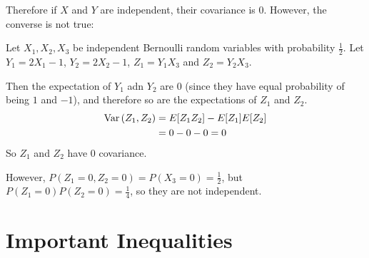 \documentclass[../Main.tex]{subfiles}
\begin{document}
Therefore if $X$ and $Y$ are independent, their covariance is 0. However, the converse is not true:
\begin{example}
    Let $X_1, X_2, X_3$ be independent Bernoulli random variables with probability $\frac{1}{2}$. Let $Y_1 = 2X_1 - 1$, $Y_2 = 2X_2 - 1$, $Z_1 = Y_1 X_3$ and $Z_2 = Y_2 X_3$.\par
    Then the expectation of $Y_1$ adn $Y_2$ are 0 (since they have equal probability of being $1$ and $-1$), and therefore so are the expectations of $Z_1$ and $Z_2$.
    \begin{align*}
        \operatorname{Var}{(Z_1, Z_2)} &= E[Z_1 Z_2] - E[Z_1] E[Z_2] \\
        &= 0 - 0 - 0 = 0
    \end{align*}
    So $Z_1$ and $Z_2$ have 0 covariance.\par
    However, $P(Z_1 = 0, Z_2 = 0) = P(X_3 = 0) = \frac{1}{2}$, but $P(Z_1 = 0)P(Z_2 = 0) = \frac{1}{4}$, so they are not independent.
\end{example}
\section{Important Inequalities}
\end{document}
